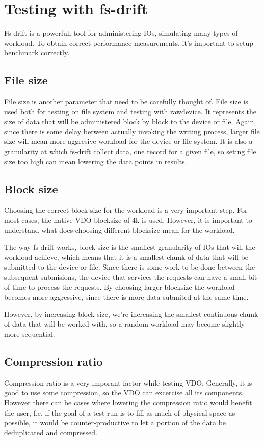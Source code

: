 \documentclass[
  color, %
  table, %
  lof,   %
  lot,   %
]{fithesis3}
\begin{document}
\clearpage


\section{Testing with fs-drift}
Fs-drift is a powerfull tool for administering IOs, simulating many types of workload. To obtain correct performance measurements, it's important to setup benchmark correctly.

\subsection{File size}
File size is another parameter that need to be carefully thought of. File size is used both for testing on file system and testing with rawdevice. It represents the size of data that will be administered block by block to the device or file. Again, since there is some delay between actually invoking the writing process, larger file size will mean more aggresive workload for the device or file system. It is also a granularity at which fs-drift collect data, one record for a given file, so seting file size too high can mean lowering the data points in results.

\subsection{Block size}
Choosing the correct block size for the workload is a very important step. For most cases, the native VDO blocksize of 4k is used. However, it is important to understand what does choosing different blocksize mean for the workload.

The way fs-drift works, block size is the smallest granularity of IOs that will the workload achieve, which means that it is a smallest chunk of data that will be submitted to the device or file. Since there is some work to be done between the subsequent submisions, the device that services the requests can have a small bit of time to process the requests. By choosing larger blocksize the workload becomes more aggressive, since there is more data submited at the same time.

However, by increasing block size, we're increasing the smallest continuous chunk of data that will be worked with, so a random workload may become slightly more sequential.

\subsection{Compression ratio}
Compression ratio is a very imporant factor while testing VDO. Generally, it is good to use some compression, so the VDO can excercise all its components. However there can be cases where lowering the compression ratio would benefit the user, f.e. if the goal of a test run is to fill as much of physical space as possible, it would be counter-productive to let a portion of the data be deduplicated and compressed.
\end{document}
